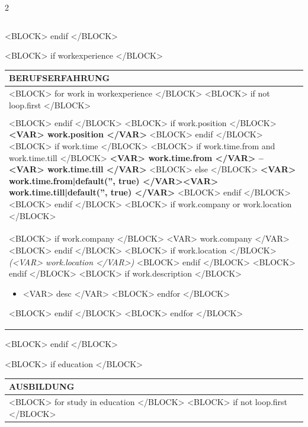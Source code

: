 \documentclass[<VAR> meta.fontsize|default('10pt', true) </VAR>]{extarticle} %
\begin{document}
\begin{paracol}{2}
\begin{tabularx}{\columnwidth}{>{\raggedright\arraybackslash}X}
\end{tabularx}
<BLOCK> endif </BLOCK>

<BLOCK> if workexperience </BLOCK>
\medskip
\begin{tabularx}{\columnwidth}{>{\raggedright\arraybackslash}X}

    \large\textbf{BERUFSERFAHRUNG} \\
    \toprule[1pt]

    <BLOCK> for work in workexperience </BLOCK>
        <BLOCK> if not loop.first </BLOCK>

        \\\\
        \toprule[0.5pt]
        <BLOCK> endif </BLOCK>
        <BLOCK> if work.position </BLOCK>
        \textbf{<VAR> work.position </VAR>}
        <BLOCK> endif </BLOCK>
        <BLOCK> if work.time </BLOCK>
        <BLOCK> if work.time.from and work.time.till </BLOCK>
        \hfill \textbf{<VAR> work.time.from </VAR> – <VAR> work.time.till </VAR>}
        <BLOCK> else </BLOCK>
        \hfill \textbf{<VAR> work.time.from|default('', true) </VAR><VAR> work.time.till|default('', true) </VAR>}
        <BLOCK> endif </BLOCK>
        <BLOCK> endif </BLOCK>
        <BLOCK> if work.company or work.location </BLOCK>
        \\
        <BLOCK> if work.company </BLOCK>
        <VAR> work.company </VAR> 
        <BLOCK> endif </BLOCK>
        <BLOCK> if work.location </BLOCK>
        \textit{(<VAR> work.location </VAR>)}
        <BLOCK> endif </BLOCK>
        <BLOCK> endif </BLOCK>
        <BLOCK> if work.description </BLOCK>
        \begin{itemize}
        <BLOCK> for desc in work.description </BLOCK>
            \item <VAR> desc </VAR>
        <BLOCK> endfor </BLOCK>
        \end{itemize}
        <BLOCK> endif </BLOCK>
    <BLOCK> endfor </BLOCK>

\end{tabularx}
<BLOCK> endif </BLOCK>

<BLOCK> if education </BLOCK>
\medskip
\begin{tabularx}{\columnwidth}{>{\raggedright\arraybackslash}X}

    \large\textbf{AUSBILDUNG} \\
    \toprule[1pt]

    <BLOCK> for study in education </BLOCK>
        <BLOCK> if not loop.first </BLOCK>


\end{tabularx}
\end{paracol}
\end{document}
